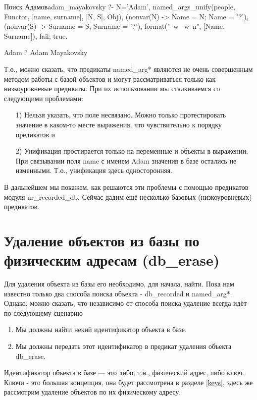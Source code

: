 \documentclass[a4paper]{book}
\def\tn{т.\thinspace н.}
\begin{document}
\begin{example}{Поиск Адамов}{adam_mayakovsky}
?- N='Adam', 
   named_args_unify(people, Functor, [name, surname], 
                    [N, S], Obj), 
   (nonvar(N) -> Name = N; Name = '?'), 
   (nonvar(S) -> Surname = S; Surname = '?'), 
   format("~w ~w~n", [Name, Surname]), fail; true.
                                                              
Adam ?
Adam Mayakovsky
\end{example}

Т.о., можно сказать, что предикаты named\_arg* являются
не очень совершенным методом работы с базой объектов и могут
рассматриваться только как низкоуровневые предикаты. При их
использовании мы сталкиваемся со следующими проблемами:

\begin{itemize}
\item[1)] Нельзя указать, что поле несвязано. Можно только
  протестировать значение в каком-то месте выражения, что
  чувствительно к порядку предикатов и
\item[2)] Унификация простирается только на переменные и объекты в
  выражении. При связывании поля name с именем Adam значения в
  базе остались не изменными. Т.о., унификация здесь
  односторонняя.
\end{itemize}

В дальнейшем мы покажем, как решаются эти проблемы с помощью
предикатов модуля ur\_recorded\_db. Сейчас дадим ещё несколько
базовых (низкоуровневых) предикатов.

\section{Удаление объектов из базы по физическим адресам
  (db\_erase)}
\label{db_erase}
\label{db_copy}

Для удаления объекта из базы его необходимо, для начала,
найти. Пока нам известно только два способа поиска объекта -
db\_recorded и named\_arg*. Однако, можно сказать, что независимо
от способа поиска удаление всегда идёт по следующему сценарию

\begin{enumerate}
\item Мы должны найти некий идентификатор объекта в базе.
\item Мы должны передать этот идентификатор в предикат удаления
  объекта db\_erase.
\end{enumerate}

Идентификатор объекта в базе --- это либо, \tn, физический адрес,
либо ключ. Ключи - это большая концепция, она будет рассмотрена в
разделе \ref{keys}, здесь же рассмотрим удаление объектов по их
физическому адресу.
\end{document}
